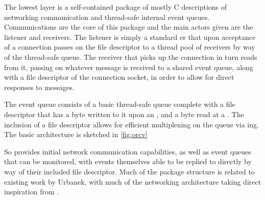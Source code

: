 The lowest layer is a self-contained package of mostly C descriptions of networking communication and thread-safe internal event queues.
Communications are the core of this package and the main actors given are the listener and receivers.
The listener is simply a standard er that upon acceptance of a connection passes on the file descriptor to a thread pool of receivers by way of the thread-safe queue.
The receiver that picks up the connection in turn reads from it, passing on whatever message is received to a shared event queue, along with a file descriptor of the connection socket, in order to allow for direct responses to messages.

The event queue consists of a basic thread-safe queue complete with a file descriptor that has a byte written to it upon an , and a byte read at a .
The inclusion of a file descriptor allows for efficient multiplexing on the queue via ing.
The basic architecture is sketched in \cref{fig:orcv}

\begin{sidewaysfigure}
\centering

\caption{\label{fig:orcv}orcv architectural sketch.}
\end{sidewaysfigure}

So \orcv{} provides initial network communication capabilities, as well as event queues that can be monitored, with events themselves able to be replied to directly by way of their included file descriptor.
Much of the package structure is related to existing work by Urbanek, with much of the networking architecture taking direct inspiration from \textcite{stevens1997network}.
